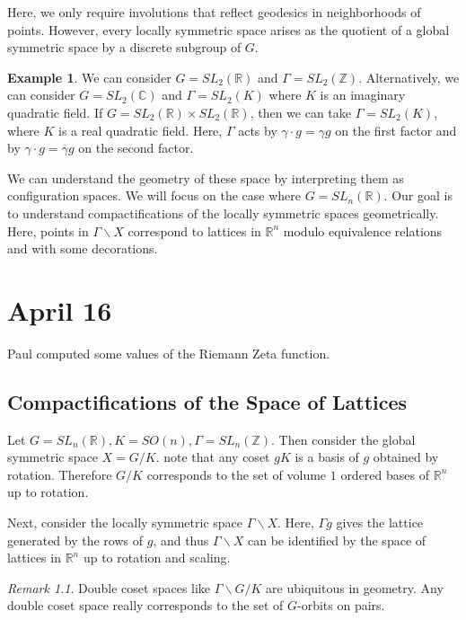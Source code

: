 \documentclass[leqno, openany]{memoir}
\theoremstyle{definition}
\newtheorem{exm}[thm]{Example}
\theoremstyle{remark}
\newtheorem{rmk}[thm]{Remark}
\theoremstyle{plain}
\theoremstyle{definition}
\theoremstyle{remark}
\newcommand{\R}{\mathbb{R}}
\newcommand{\C}{\mathbb{C}}
\newcommand{\Z}{\mathbb{Z}}
\begin{document}
Here, we only require involutions that reflect geodesics in neighborhoods of points. However, every locally symmetric space arises as the quotient of a global symmetric space by a discrete subgroup of $G$.

\begin{exm}
    We can consider $G = SL_2(\R)$ and $\Gamma = SL_2(\Z)$. Alternatively, we can consider $G = SL_2(\C)$ and $\Gamma = SL_2(K)$ where $K$ is an imaginary quadratic field. If $G = SL_2(\R) \times SL_2(\R)$, then we can take $\Gamma = SL_2(K)$, where $K$ is a real quadratic field. Here, $\Gamma$ acts by $\gamma \cdot g = \gamma g$ on the first factor and by $\gamma \cdot g = \overline{\gamma} g$ on the second factor.
\end{exm}

We can understand the geometry of these space by interpreting them as configuration spaces. We will focus on the case where $G = SL_n(\R)$. Our goal is to understand compactifications of the locally symmetric spaces geometrically. Here, points in $\Gamma \backslash X$ correspond to lattices in $\R^n$ modulo equivalence relations and with some decorations.

\chapter{April 16}%
\label{cha:april_16}

Paul computed some values of the Riemann Zeta function.

\section{Compactifications of the Space of Lattices}%
\label{sec:compactifications_of_the_space_of_lattices}

Let $G = SL_n(\R), K = SO(n), \Gamma = SL_n(\Z)$. Then consider the global symmetric space $X = G/K$. note that any coset $gK$ is a basis of $g$ obtained by rotation. Therefore $G/K$ corresponds to the set of volume $1$ ordered bases of $\R^n$ up to rotation. 

Next, consider the locally symmetric space $\Gamma \backslash X$. Here, $\Gamma g$ gives the lattice generated by the rows of $g$, and thus $\Gamma \backslash X$ can be identified by the space of lattices in $\R^n$ up to rotation and scaling.

\begin{rmk}
    Double coset spaces like $\Gamma \backslash G / K$ are ubiquitous in geometry. Any double coset space really corresponds to the set of $G$-orbits on pairs.
\end{rmk}
\end{document}
